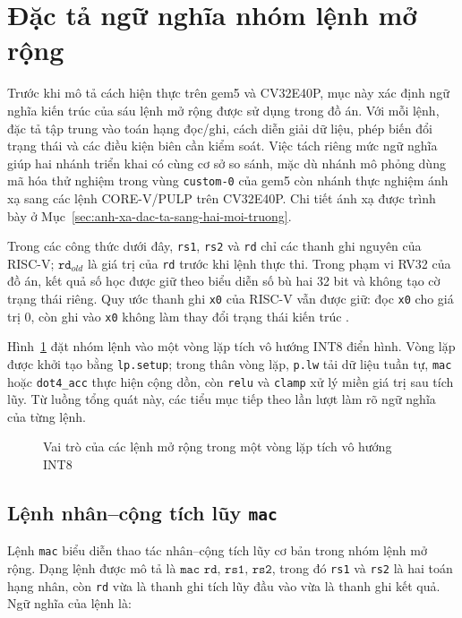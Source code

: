 \documentclass[../DoAn.tex]{subfiles}
\begin{document}
\section{Đặc tả ngữ nghĩa nhóm lệnh mở rộng}
\label{sec:dac-ta-ngu-nghia-nhom-lenh-mo-rong}

Trước khi mô tả cách hiện thực trên gem5 và CV32E40P, mục này xác định ngữ nghĩa kiến trúc của sáu lệnh mở rộng được sử dụng trong đồ án. Với mỗi lệnh, đặc tả tập trung vào toán hạng đọc/ghi, cách diễn giải dữ liệu, phép biến đổi trạng thái và các điều kiện biên cần kiểm soát. Việc tách riêng mức ngữ nghĩa giúp hai nhánh triển khai có cùng cơ sở so sánh, mặc dù nhánh mô phỏng dùng mã hóa thử nghiệm trong vùng \texttt{custom-0} của gem5 còn nhánh thực nghiệm ánh xạ sang các lệnh CORE-V/PULP trên CV32E40P. Chi tiết ánh xạ được trình bày ở Mục~\ref{sec:anh-xa-dac-ta-sang-hai-moi-truong}.

Trong các công thức dưới đây, \texttt{rs1}, \texttt{rs2} và \texttt{rd} chỉ các thanh ghi nguyên của RISC-V; \(\texttt{rd}_{old}\) là giá trị của \texttt{rd} trước khi lệnh thực thi. Trong phạm vi RV32 của đồ án, kết quả số học được giữ theo biểu diễn số bù hai 32 bit và không tạo cờ trạng thái riêng. Quy ước thanh ghi \texttt{x0} của RISC-V vẫn được giữ: đọc \texttt{x0} cho giá trị 0, còn ghi vào \texttt{x0} không làm thay đổi trạng thái kiến trúc \cite{riscv_unpriv_2026}.

Hình~\ref{fig:ai-ext-loop-semantics} đặt nhóm lệnh vào một vòng lặp tích vô hướng INT8 điển hình. Vòng lặp được khởi tạo bằng \texttt{lp.setup}; trong thân vòng lặp, \texttt{p.lw} tải dữ liệu tuần tự, \texttt{mac} hoặc \texttt{dot4\_acc} thực hiện cộng dồn, còn \texttt{relu} và \texttt{clamp} xử lý miền giá trị sau tích lũy. Từ luồng tổng quát này, các tiểu mục tiếp theo lần lượt làm rõ ngữ nghĩa của từng lệnh.

\begin{figure}[H]
    \centering
    
    \caption{Vai trò của các lệnh mở rộng trong một vòng lặp tích vô hướng INT8}
    \label{fig:ai-ext-loop-semantics}
\end{figure}

\subsection{Lệnh nhân--cộng tích lũy \texttt{mac}}
\label{subsec:dac-ta-mac}

Lệnh \texttt{mac} biểu diễn thao tác nhân--cộng tích lũy cơ bản trong nhóm lệnh mở rộng. Dạng lệnh được mô tả là \(\texttt{mac rd, rs1, rs2}\), trong đó \texttt{rs1} và \texttt{rs2} là hai toán hạng nhân, còn \texttt{rd} vừa là thanh ghi tích lũy đầu vào vừa là thanh ghi kết quả. Ngữ nghĩa của lệnh là:
\end{document}
